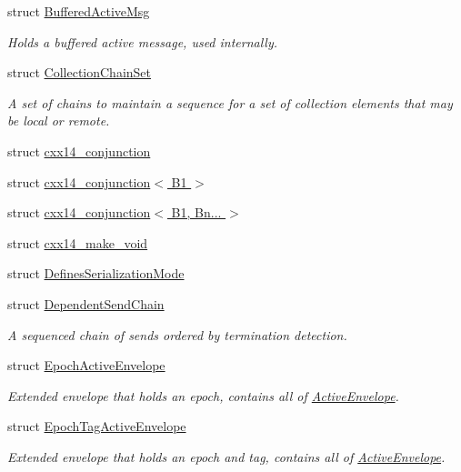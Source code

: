 \begin{DoxyCompactItemize}
struct \hyperlink{structvt_1_1messaging_1_1_buffered_active_msg}{Buffered\+Active\+Msg}
\begin{DoxyCompactList}\small\item\em Holds a buffered active message, used internally. \end{DoxyCompactList}\item 
struct \hyperlink{classvt_1_1messaging_1_1_collection_chain_set}{Collection\+Chain\+Set}
\begin{DoxyCompactList}\small\item\em A set of chains to maintain a sequence for a set of collection elements that may be local or remote. \end{DoxyCompactList}\item 
struct \hyperlink{structvt_1_1messaging_1_1cxx14__conjunction}{cxx14\+\_\+conjunction}
\item 
struct \hyperlink{structvt_1_1messaging_1_1cxx14__conjunction_3_01_b1_01_4}{cxx14\+\_\+conjunction$<$ B1 $>$}
\item 
struct \hyperlink{structvt_1_1messaging_1_1cxx14__conjunction_3_01_b1_00_01_bn_8_8_8_01_4}{cxx14\+\_\+conjunction$<$ B1, Bn... $>$}
\item 
struct \hyperlink{structvt_1_1messaging_1_1cxx14__make__void}{cxx14\+\_\+make\+\_\+void}
\item 
struct \hyperlink{structvt_1_1messaging_1_1_defines_serialization_mode}{Defines\+Serialization\+Mode}
\item 
struct \hyperlink{classvt_1_1messaging_1_1_dependent_send_chain}{Dependent\+Send\+Chain}
\begin{DoxyCompactList}\small\item\em A sequenced chain of sends ordered by termination detection. \end{DoxyCompactList}\item 
struct \hyperlink{structvt_1_1messaging_1_1_epoch_active_envelope}{Epoch\+Active\+Envelope}
\begin{DoxyCompactList}\small\item\em Extended envelope that holds an epoch, contains all of {\ttfamily \hyperlink{structvt_1_1messaging_1_1_active_envelope}{Active\+Envelope}}. \end{DoxyCompactList}\item 
struct \hyperlink{structvt_1_1messaging_1_1_epoch_tag_active_envelope}{Epoch\+Tag\+Active\+Envelope}
\begin{DoxyCompactList}\small\item\em Extended envelope that holds an epoch and tag, contains all of {\ttfamily \hyperlink{structvt_1_1messaging_1_1_active_envelope}{Active\+Envelope}}. \end{DoxyCompactList}\item 

\end{DoxyCompactItemize}
